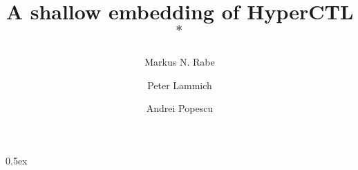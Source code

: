 \documentclass[11pt,a4paper]{article}
\begin{document}
\title{A shallow embedding of HyperCTL$^*$}
\author{Markus N. Rabe \and Peter Lammich \and Andrei Popescu}
\date{}
\maketitle

\tableofcontents

\parindent 0pt\parskip 0.5ex




\end{document}
